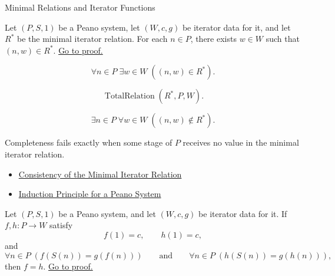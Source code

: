 \begin{topicbox}{Minimal Relations and Iterator Functions}
\begin{tcolorbox}[colback=lembox, colframe=lemborder, arc=2pt,
  left=6pt, right=6pt, top=4pt, bottom=4pt,
  title={\small\textbf{Lemma (Completeness of the Minimal Iterator Relation)}},
  fonttitle=\small\bfseries]
\begin{lemma}
\label{lem:minimal-iterator-relation-complete}
Let $(P,S,1)$ be a Peano system, let $(W,c,g)$ be iterator data for it, and let
$R^*$ be the minimal iterator relation. For each $n\in P$, there exists
$w\in W$ such that $(n,w)\in R^*$.
\hyperref[prf:minimal-iterator-relation-complete]{Go to proof.}
\end{lemma}
\end{tcolorbox}

\begin{remark*}
\[
\forall n\in P\;\exists w\in W\;((n,w)\in R^*).
\]
\end{remark*}

\begin{remark*}
\[
\operatorname{TotalRelation}(R^*,P,W).
\]
\end{remark*}

\begin{remark*}
\[
\exists n\in P\;\forall w\in W\;((n,w)\notin R^*).
\]
\end{remark*}

\begin{remark*}
Completeness fails exactly when some stage of $P$ receives no value in the
minimal iterator relation.
\end{remark*}

\begin{remark*}[Dependencies]
\begin{itemize}
  \item \hyperref[lem:iterator-relation-consistency]{Consistency of the Minimal Iterator Relation}
  \item \hyperref[thm:induction-principle-for-peano-system]{Induction Principle for a Peano System}
\end{itemize}
\end{remark*}

\begin{tcolorbox}[colback=lembox, colframe=lemborder, arc=2pt,
  left=6pt, right=6pt, top=4pt, bottom=4pt,
  title={\small\textbf{Lemma (Uniqueness of Iterator Functions)}},
  fonttitle=\small\bfseries]
\begin{lemma}
\label{lem:uniqueness-of-iterator-functions}
Let $(P,S,1)$ be a Peano system, and let $(W,c,g)$ be iterator data for it. If
$f,h:P\to W$ satisfy
\[
f(1)=c,\qquad h(1)=c,
\]
and
\[
\forall n\in P\;(f(S(n))=g(f(n)))
\qquad\text{and}\qquad
\forall n\in P\;(h(S(n))=g(h(n))),
\]
then $f=h$.
\hyperref[prf:uniqueness-of-iterator-functions]{Go to proof.}
\end{lemma}
\end{tcolorbox}


\end{topicbox}
